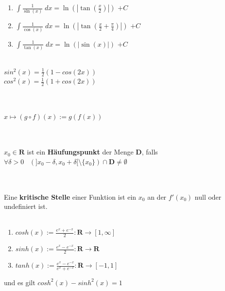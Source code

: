\documentclass[10pt]{article}
\def\light#1{{\color{light}#1}}
\begin{document}
\begin{multicols*}{3}
\begin{enumerate}[label=(\arabic*)]
    \item $\int \frac{1}{\sin(x)} \; dx = \ln(|\tan(\frac{x}{2})|)$ \light{$+C$}
    \item $\int \frac{1}{\cos(x)} \; dx = \ln(|\tan(\frac{x}{2} + \frac{\pi}{4})|)$ \light{$+C$}
    \item $\int \frac{1}{\tan(x)} \; dx = \ln(|\sin(x)|)$ \light{$+C$}
  \end{enumerate}
  \\
  $sin^2(x) = \frac{1}{2} (1 - cos(2x))$\\
  $cos^2(x) = \frac{1}{2} (1 + cos(2x))$\\
  \\
  \\
  $
    x \mapsto (g \circ f)(x) := g(f(x))
  $\\ \\
  \\
  $x_0 \in \mathbf{R}$ ist ein \textbf{Häufungspunkt} der Menge $\mathbf{D}$,
  falls $\forall \delta > 0 \;\;\; (]x_0 - \delta, x_0 + \delta[ \setminus \{x_0\}) \cap \mathbf{D} \neq \emptyset$\\ \\
  \\
  Eine \textbf{kritische Stelle} einer Funktion ist ein $x_0$ an der $f'(x_0)$ null
  oder undefiniert ist.\\ \\
  \begin{enumerate}[label=(\arabic*)]
    \item $cosh(x) := \frac{e^x + e^{-x}}{2}: \mathbf{R} \rightarrow [1, \infty]$
    \item $sinh(x) := \frac{e^x - e^{-x}}{2}: \mathbf{R} \rightarrow \mathbf{R}$
    \item $tanh(x) := \frac{e^x - e^{-x}}{e^x + e^{-x}}: \mathbf{R} \rightarrow [-1, 1]$
  \end{enumerate}
  und es gilt $cosh^2(x) - sinh^2(x) = 1$\\ \\
\end{multicols*}
\end{document}
